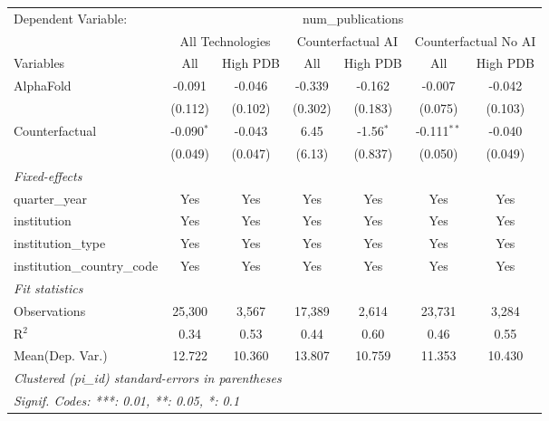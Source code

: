 \begingroup
\centering
\begin{tabular}{lcccccc}
   \tabularnewline \midrule \midrule
   Dependent Variable: & \multicolumn{6}{c}{num\_publications}\\
 & \multicolumn{2}{c}{All Technologies} & \multicolumn{2}{c}{Counterfactual AI} & \multicolumn{2}{c}{Counterfactual No AI} \\
\cmidrule(lr){1-1}\cmidrule(lr){2-3} \cmidrule(lr){4-5} \cmidrule(lr){6-7}
Variables & \multicolumn{1}{c}{All} & \multicolumn{1}{c}{High PDB} & \multicolumn{1}{c}{All} & \multicolumn{1}{c}{High PDB} & \multicolumn{1}{c}{All} & \multicolumn{1}{c}{High PDB} \\
\cmidrule(lr){1-1}\cmidrule(lr){2-2} \cmidrule(lr){3-3} \cmidrule(lr){4-4} \cmidrule(lr){5-5} \cmidrule(lr){6-6} \cmidrule(lr){7-7}
   AlphaFold                    & -0.091       & -0.046  & -0.339  & -0.162      & -0.007        & -0.042\\   
                                & (0.112)      & (0.102) & (0.302) & (0.183)     & (0.075)       & (0.103)\\   
   Counterfactual               & -0.090$^{*}$ & -0.043  & 6.45    & -1.56$^{*}$ & -0.111$^{**}$ & -0.040\\   
                                & (0.049)      & (0.047) & (6.13)  & (0.837)     & (0.050)       & (0.049)\\   
   \midrule
   \emph{Fixed-effects}\\
   quarter\_year                & Yes          & Yes     & Yes     & Yes         & Yes           & Yes\\  
   institution                  & Yes          & Yes     & Yes     & Yes         & Yes           & Yes\\  
   institution\_type            & Yes          & Yes     & Yes     & Yes         & Yes           & Yes\\  
   institution\_country\_code   & Yes          & Yes     & Yes     & Yes         & Yes           & Yes\\  
   \midrule
   \emph{Fit statistics}\\
   Observations                 & 25,300       & 3,567   & 17,389  & 2,614       & 23,731        & 3,284\\  
   R$^2$                        & 0.34         & 0.53    & 0.44    & 0.60        & 0.46          & 0.55\\  
Mean(Dep. Var.) & 12.722 & 10.360 & 13.807 & 10.759 & 11.353 & 10.430 \\
   \midrule \midrule
   \multicolumn{7}{l}{\emph{Clustered (pi\_id) standard-errors in parentheses}}\\
   \multicolumn{7}{l}{\emph{Signif. Codes: ***: 0.01, **: 0.05, *: 0.1}}\\
\end{tabular}
\par\endgroup
